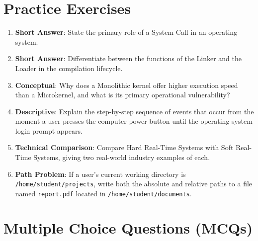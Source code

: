 \section{Practice Exercises}

\begin{practiceset}
\begin{enumerate}[leftmargin=1.5em]
    \item \textbf{Short Answer}: State the primary role of a System Call in an operating system.
    \item \textbf{Short Answer}: Differentiate between the functions of the Linker and the Loader in the compilation lifecycle.
    \item \textbf{Conceptual}: Why does a Monolithic kernel offer higher execution speed than a Microkernel, and what is its primary operational vulnerability?
    \item \textbf{Descriptive}: Explain the step-by-step sequence of events that occur from the moment a user presses the computer power button until the operating system login prompt appears.
    \item \textbf{Technical Comparison}: Compare Hard Real-Time Systems with Soft Real-Time Systems, giving two real-world industry examples of each.
    \item \textbf{Path Problem}: If a user's current working directory is \texttt{/home/student/projects}, write both the absolute and relative paths to a file named \texttt{report.pdf} located in \texttt{/home/student/documents}.
\end{enumerate}
\end{practiceset}

\section{Multiple Choice Questions (MCQs)}

